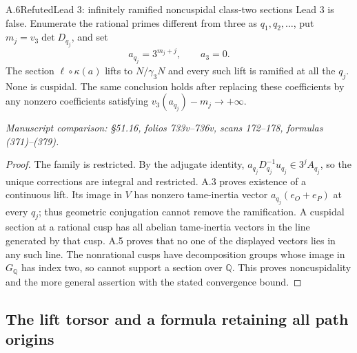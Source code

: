 \begin{statement}{A.6}{Refuted}{Lead 3: infinitely ramified noncuspidal class-two sections}
Lead 3 is false. Enumerate the rational primes different from three
as $q_1,q_2,\ldots$, put $m_j=v_3\det D_{q_j}$, and set
\[
 a_{q_j}=3^{m_j+j},\qquad a_3=0.
 \tag{A.6.1}
\]
The section $\ell\circ\kappa(a)$ lifts to $N/\gamma_3N$ and every
such lift is ramified at all the $q_j$. None is cuspidal.
The same conclusion holds after replacing these coefficients by
any nonzero coefficients satisfying
$v_3(a_{q_j})-m_j\longrightarrow+\infty$.
\par\smallskip\noindent\emph{Manuscript comparison: \S51.16,
folios 733v--736v, scans 172--178, formulas (371)--(379).}
\end{statement}
\begin{proof}
The family is restricted. By the adjugate identity,
$a_{q_j}D_{q_j}^{-1}u_{q_j}\in3^jA_{q_j}$, so the unique corrections
are integral and restricted. A.3 proves existence of a continuous
lift. Its image in $V$ has nonzero tame-inertia vector
$a_{q_j}(e_O+e_P)$ at every $q_j$; thus geometric conjugation cannot
remove the ramification. A cuspidal section at a rational cusp
has all abelian tame-inertia vectors in the line generated by
that cusp. A.5 proves that no one of the displayed vectors lies
in any such line. The nonrational cusps have decomposition groups
whose image in $G_{\mathbb Q}$ has index two, so cannot support
a section over $\mathbb Q$. This proves noncuspidality and the
more general assertion with the stated convergence bound.
\end{proof}

\subsection{The lift torsor and a formula retaining all path origins}

